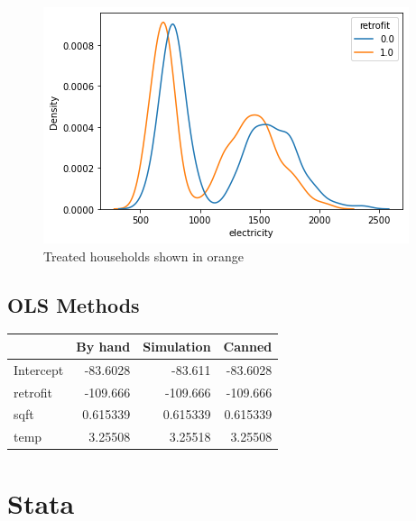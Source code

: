 \documentclass{article}
\begin{document}
\begin{figure}[ht]
    \centering
    \includegraphics[scale = 0.7]{kdeplot.png}
    \caption{Treated households shown in orange}
\end{figure}

\vspace{5cm}


\subsection{OLS Methods}

\begin{longtable}{lrrr}
\hline
           &     By hand &   Simulation &      Canned \\
\hline
\endhead
 Intercept &  -83.6028   &   -83.611    &  -83.6028   \\
 retrofit  & -109.666    &  -109.666    & -109.666    \\
 sqft      &    0.615339 &     0.615339 &    0.615339 \\
 temp      &    3.25508  &     3.25518  &    3.25508  \\
\hline
\end{longtable}


\section{Stata}
\end{document}
